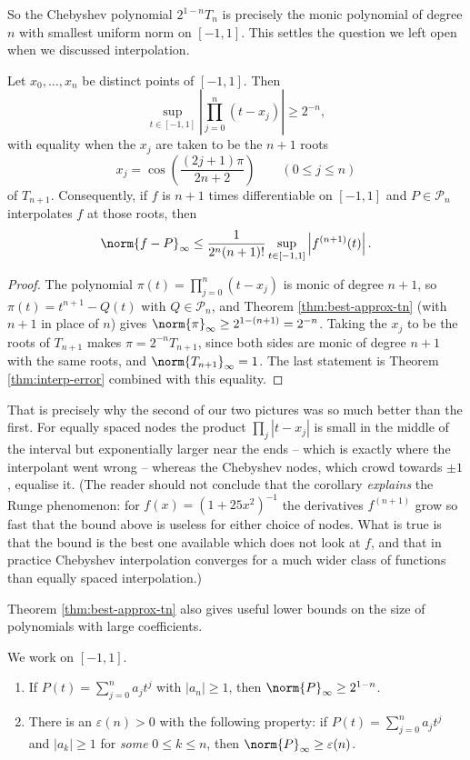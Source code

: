 \documentclass[a4paper]{scrartcl}
\newcommand{\Pn}{\mathcal{P}}
\begin{document}
So the Chebyshev polynomial $2^{1-n}T_n$ is precisely the monic polynomial of degree $n$ with smallest uniform norm on $[-1,1]$. This settles the question we left open when we discussed interpolation.

\begin{corollary}\label{cor:cheb-nodes}
	Let $x_0,\ldots,x_n$ be distinct points of $[-1,1]$. Then
	$$\sup_{t\in[-1,1]}\left|\prod_{j=0}^n(t-x_j)\right| \geq 2^{-n},$$
	with equality when the $x_j$ are taken to be the $n+1$ roots
	$$x_j = \cos\left(\frac{(2j+1)\pi}{2n+2}\right) \qquad (0 \leq j \leq n)$$
	of $T_{n+1}$. Consequently, if $f$ is $n+1$ times differentiable on $[-1,1]$ and $P\in\Pn_n$ interpolates $f$ at those roots, then
	$$\norm{f-P}_\infty \leq \frac{1}{2^n(n+1)!}\sup_{t\in[-1,1]}\left|f^{(n+1)}(t)\right|.$$
\end{corollary}

\begin{proof}
	The polynomial $\pi(t) = \prod_{j=0}^n(t-x_j)$ is monic of degree $n+1$, so $\pi(t) = t^{n+1}-Q(t)$ with $Q\in\Pn_n$, and Theorem \ref{thm:best-approx-tn} (with $n+1$ in place of $n$) gives $\norm{\pi}_\infty\geq2^{1-(n+1)} = 2^{-n}$. Taking the $x_j$ to be the roots of $T_{n+1}$ makes $\pi = 2^{-n}T_{n+1}$, since both sides are monic of degree $n+1$ with the same roots, and $\norm{T_{n+1}}_\infty=1$. The last statement is Theorem \ref{thm:interp-error} combined with this equality.
\end{proof}

That is precisely why the second of our two pictures was so much better than the first. For equally spaced nodes the product $\prod_j|t-x_j|$ is small in the middle of the interval but exponentially larger near the ends -- which is exactly where the interpolant went wrong -- whereas the Chebyshev nodes, which crowd towards $\pm1$, equalise it. (The reader should not conclude that the corollary \emph{explains} the Runge phenomenon: for $f(x)=(1+25x^2)^{-1}$ the derivatives $f^{(n+1)}$ grow so fast that the bound above is useless for either choice of nodes. What is true is that the bound is the best one available which does not look at $f$, and that in practice Chebyshev interpolation converges for a much wider class of functions than equally spaced interpolation.)

Theorem \ref{thm:best-approx-tn} also gives useful lower bounds on the size of polynomials with large coefficients.

\begin{corollary}\label{cor:coeff-bound}
	We work on $[-1,1]$.
	\begin{enumerate}[label=(\roman*)]
		\item If $P(t) = \sum_{j=0}^n a_jt^j$ with $|a_n|\geq1$, then $\norm{P}_\infty \geq 2^{1-n}$.
		\item There is an $\varepsilon(n)>0$ with the following property: if $P(t) = \sum_{j=0}^n a_jt^j$ and $|a_k|\geq1$ for \emph{some} $0\leq k\leq n$, then $\norm{P}_\infty\geq \varepsilon(n)$.
	\end{enumerate}
\end{corollary}
\end{document}
